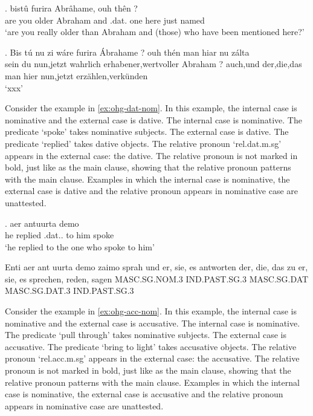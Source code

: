 \exg. bistû furira Abrâhame, ouh thên    ?\\
{are you} older\scsub{[dat]} {Abraham} and .\ac{dat}. one here just named\scsub{[acc]}\\
`are you really older than Abraham and (those) who have been mentioned here?' \label{ex:ohg-dat-acc}

\exg. Bis tú nu {zi wáre} furira Ábrahame ? ouh thén man hiar nu zálta\\
 sein du nun,jetzt wahrlich erhabener,wertvoller Abraham ? auch,und der,die,das man hier nun,jetzt erzählen,verkünden\\
 `xxx' \label{ex:ohg-dat-acc-rep}

Consider the example in \ref{ex:ohg-dat-nom}. In this example, the internal case is nominative and the external case is dative.
The internal case is nominative. The predicate  `spoke' takes nominative subjects.
The external case is dative. The predicate  `replied' takes dative objects.
The relative pronoun  `\ac{rel}.\ac{dat}.\ac{m}.\ac{sg}' appears in the external case: the dative. The relative pronoun is not marked in bold, just like as the main clause, showing that the relative pronoun patterns with the main clause.
Examples in which the internal case is nominative, the external case is dative and the relative pronoun appears in nominative case are unattested.

\exg. aer antuurta demo  \\
he replied\scsub{[dat]} .\ac{dat}.. {to him} spoke\scsub{[nom]}\\
`he replied to the one who spoke to him' \label{ex:ohg-dat-nom}

Enti	aer	ant	uurta	demo	zaimo	sprah
und	er, sie, es	antworten	der, die, das	zu	er, sie, es	sprechen, reden, sagen
MASC.SG.NOM.3	IND.PAST.SG.3	MASC.SG.DAT		MASC.SG.DAT.3	IND.PAST.SG.3

Consider the example in \ref{ex:ohg-acc-nom}. In this example, the internal case is nominative and the external case is accusative.
The internal case is nominative. The predicate  `pull through' takes nominative subjects.
The external case is accusative. The predicate  `bring to light' takes accusative objects.
The relative pronoun  `\ac{rel}.\ac{acc}.\ac{m}.\ac{sg}' appears in the external case: the accusative. The relative pronoun is not marked in bold, just like as the main clause, showing that the relative pronoun patterns with the main clause.
Examples in which the internal case is nominative, the external case is accusative and the relative pronoun appears in nominative case are unattested.


